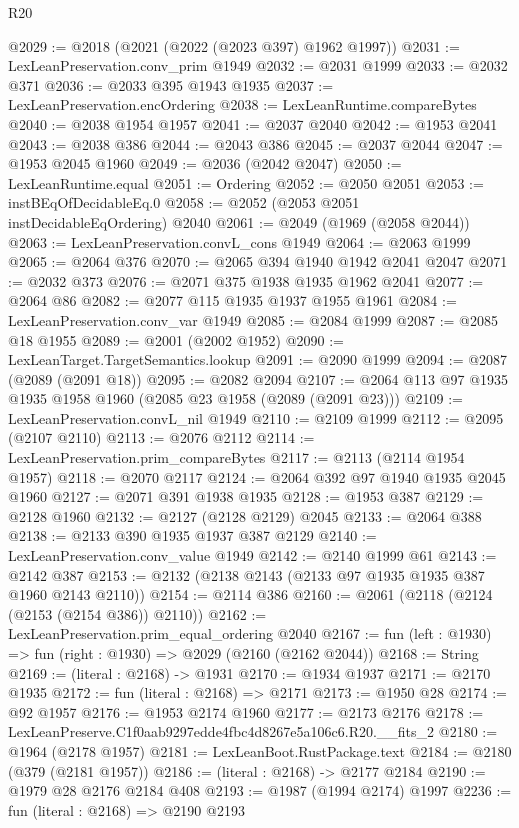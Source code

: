 \begin{lexlean}{R20}
\begin{coremodule}
@2029 := @2018 (@2021 (@2022 (@2023 @397) @1962 @1997))
@2031 := LexLeanPreservation.conv_prim @1949
@2032 := @2031 @1999
@2033 := @2032 @371
@2036 := @2033 @395 @1943 @1935
@2037 := LexLeanPreservation.encOrdering
@2038 := LexLeanRuntime.compareBytes
@2040 := @2038 @1954 @1957
@2041 := @2037 @2040
@2042 := @1953 @2041
@2043 := @2038 @386
@2044 := @2043 @386
@2045 := @2037 @2044
@2047 := @1953 @2045 @1960
@2049 := @2036 (@2042 @2047)
@2050 := LexLeanRuntime.equal
@2051 := Ordering
@2052 := @2050 @2051
@2053 := instBEqOfDecidableEq.{0}
@2058 := @2052 (@2053 @2051 instDecidableEqOrdering) @2040
@2061 := @2049 (@1969 (@2058 @2044))
@2063 := LexLeanPreservation.convL_cons @1949
@2064 := @2063 @1999
@2065 := @2064 @376
@2070 := @2065 @394 @1940 @1942 @2041 @2047
@2071 := @2032 @373
@2076 := @2071 @375 @1938 @1935 @1962 @2041
@2077 := @2064 @86
@2082 := @2077 @115 @1935 @1937 @1955 @1961
@2084 := LexLeanPreservation.conv_var @1949
@2085 := @2084 @1999
@2087 := @2085 @18 @1955
@2089 := @2001 (@2002 @1952)
@2090 := LexLeanTarget.TargetSemantics.lookup
@2091 := @2090 @1999
@2094 := @2087 (@2089 (@2091 @18))
@2095 := @2082 @2094
@2107 := @2064 @113 @97 @1935 @1935 @1958 @1960 (@2085 @23 @1958 (@2089 (@2091 @23)))
@2109 := LexLeanPreservation.convL_nil @1949
@2110 := @2109 @1999
@2112 := @2095 (@2107 @2110)
@2113 := @2076 @2112
@2114 := LexLeanPreservation.prim_compareBytes
@2117 := @2113 (@2114 @1954 @1957)
@2118 := @2070 @2117
@2124 := @2064 @392 @97 @1940 @1935 @2045 @1960
@2127 := @2071 @391 @1938 @1935
@2128 := @1953 @387
@2129 := @2128 @1960
@2132 := @2127 (@2128 @2129) @2045
@2133 := @2064 @388
@2138 := @2133 @390 @1935 @1937 @387 @2129
@2140 := LexLeanPreservation.conv_value @1949
@2142 := @2140 @1999 @61
@2143 := @2142 @387
@2153 := @2132 (@2138 @2143 (@2133 @97 @1935 @1935 @387 @1960 @2143 @2110))
@2154 := @2114 @386
@2160 := @2061 (@2118 (@2124 (@2153 (@2154 @386)) @2110))
@2162 := LexLeanPreservation.prim_equal_ordering @2040
@2167 := fun (left : @1930) => fun (right : @1930) => @2029 (@2160 (@2162 @2044))
@2168 := String
@2169 := (literal : @2168) -> @1931
@2170 := @1934 @1937
@2171 := @2170 @1935
@2172 := fun (literal : @2168) => @2171
@2173 := @1950 @28
@2174 := @92 @1957
@2176 := @1953 @2174 @1960
@2177 := @2173 @2176
@2178 := LexLeanPreserve.C1f0aab9297edde4fbc4d8267e5a106c6.R20.__fits_2
@2180 := @1964 (@2178 @1957)
@2181 := LexLeanBoot.RustPackage.text
@2184 := @2180 (@379 (@2181 @1957))
@2186 := (literal : @2168) -> @2177 @2184
@2190 := @1979 @28 @2176 @2184 @408
@2193 := @1987 (@1994 @2174) @1997
@2236 := fun (literal : @2168) =>
  @2190
    @2193

\end{coremodule}
\end{lexlean}
